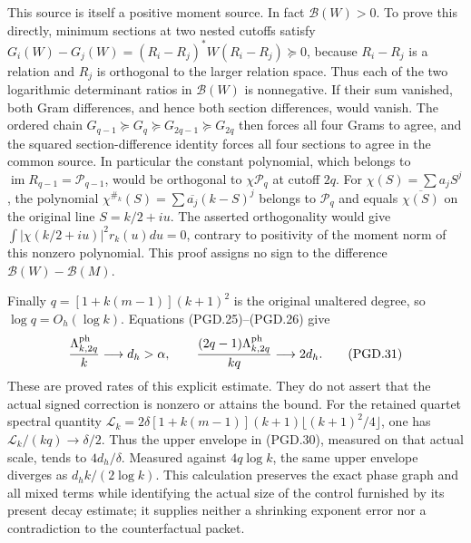 This source is itself a positive moment source. In fact
\(\mathcal B(W)>0\). To prove this directly, minimum sections at
two nested cutoffs satisfy
\(G_i(W)-G_j(W)=(R_i-R_j)^*W(R_i-R_j)\succeq0\), because
\(R_i-R_j\) is a relation and \(R_j\) is orthogonal to the
larger relation space. Thus each of the two logarithmic determinant
ratios in \(\mathcal B(W)\) is nonnegative. If their sum vanished,
both Gram differences, and hence both section differences, would
vanish. The ordered chain
\(G_{q-1}\succeq G_q\succeq G_{2q-1}\succeq G_{2q}\)
then forces all four Grams to agree, and the squared section-difference
identity forces all four sections to agree in the common source.
In particular the constant polynomial, which belongs to
\(\operatorname{im}R_{q-1}=\mathcal P_{q-1}\), would be orthogonal
to \(\chi\mathcal P_q\) at cutoff \(2q\). For
\(\chi(S)=\sum a_jS^j\), the polynomial
\(\chi^{\#_k}(S)=\sum\overline{a_j}(k-S)^j\) belongs to
\(\mathcal P_q\) and equals \(\overline{\chi(S)}\) on the
original line \(S=k/2+iu\). The asserted orthogonality would give
\(\int|\chi(k/2+iu)|^2r_k(u)du=0\), contrary to positivity of
the moment norm of this nonzero polynomial. This proof assigns no
sign to the difference \(\mathcal B(W)-\mathcal B(M)\).

Finally \(q=[1+k(m-1)](k+1)^2\) is the original unaltered degree,
so \(\log q=O_h(\log k)\). Equations (PGD.25)--(PGD.26) give
\[
 \frac{\Lambda_{k,2q}^{\rm ph}}{k}\longrightarrow d_h>\alpha,
 \qquad
 \frac{(2q-1)\Lambda_{k,2q}^{\rm ph}}{kq}
                                  \longrightarrow2d_h.
 \tag{PGD.31}\label{eq:pgd-amplified-rate}
\]
These are proved rates of this explicit estimate. They do not assert
that the actual signed correction is nonzero or attains the bound.
For the retained quartet spectral quantity
\(\mathcal L_k=2\delta[1+k(m-1)](k+1)
                 \lfloor(k+1)^2/4\rfloor\), one has
\(\mathcal L_k/(kq)\to\delta/2\). Thus the upper envelope in
(PGD.30), measured on that actual scale, tends to \(4d_h/\delta\).
Measured against \(4q\log k\), the same upper envelope diverges
as \(d_hk/(2\log k)\). This calculation preserves the exact
phase graph and all mixed terms while identifying the actual size of
the control furnished by its present decay estimate; it supplies
neither a shrinking exponent error nor a contradiction to the
counterfactual packet.
